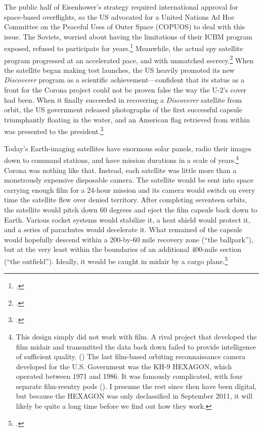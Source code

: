 \documentclass[12pt]{extarticle}
\begin{document}
The public half of Eisenhower's strategy required international approval for space-based overflights, so the US advocated for a United Nations Ad Hoc Committee on the Peaceful Uses of Outer Space (COPUOS) to deal with this issue. The Soviets, worried about having the limitations of their ICBM program exposed, refused to participate for years.\footcite[140]{day_eye_2015} Meanwhile, the actual spy satellite program progressed at an accelerated pace, and with unmatched secrecy.\footcite[51. The team started with only 30 personnel and eventually swelled to 300, almost none of whom knew the entire scope of the project. Team members had to take different routes to work to avoid being followed and were never allowed to say the word ``Corona'' on the telephone, or even the abbreviation ``C.'']{peebles_shadow_2000} When the satellite began making test launches, the US heavily promoted its new \emph{Discoverer} program as a scientific achievement---confident that its status as a front for the Corona project could not be proven false the way the U-2's cover had been. When it finally succeeded in recovering a \emph{Discoverer} satellite from orbit, the US government released photographs of the first successful capsule triumphantly floating in the water, and an American flag retrieved from within was presented to the president.\footcite[83]{peebles_shadow_2000}

Today's Earth-imaging satellites have enormous solar panels, radio their images down to command stations, and have mission durations in a scale of years.\footnote{This design simply did not work with film. A rival project that developed the film midair and transmitted the data back down failed to provide intelligence of sufficient quality. (\cite[203-204]{brugioni_eyes_2010}) The last film-based orbiting reconnaissance camera developed for the U.S. Government was the KH-9 HEXAGON, which operated between 1971 and 1986. It was famously complicated, with four separate film-reentry pods (\cite{pressel_spy_2013}). I presume the rest since then have been digital, but because the HEXAGON was only declassified in September 2011, it will likely be quite a long time before we find out how they work.} Corona was nothing like that. Instead, each satellite was little more than a monstrously expensive disposable camera. The satellite would be sent into space carrying enough film for a 24-hour mission and its camera would switch on every time the satellite flew over denied territory. After completing seventeen orbits, the satellite would pitch down 60 degrees and eject the film capsule back down to Earth. Various rocket systems would stabilize it, a heat shield would protect it, and a series of parachutes would decelerate it. What remained of the capsule would hopefully descend within a 200-by-60 mile recovery zone (``the ballpark''), but at the very least within the boundaries of an additional 400-mile section (``the outfield''). Ideally, it would be caught in midair by a cargo plane.\footcite[56]{peebles_corona_1997}
\end{document}
